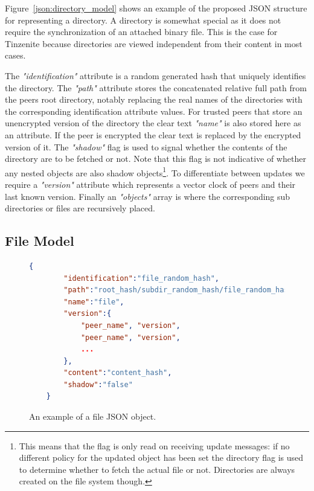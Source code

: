 Figure~\ref{json:directory_model} shows an example of the proposed JSON structure for representing a directory.
A directory is somewhat special as it does not require the synchronization of an attached binary file.
This is the case for Tinzenite because directories are viewed independent from their content in most cases.

The \textit{"identification"} attribute is a random generated hash that uniquely identifies the directory.
The \textit{"path"} attribute stores the concatenated relative full path from the peers root directory, notably replacing the real names of the directories with the corresponding identification attribute values.
For trusted peers that store an unencrypted version of the directory the clear text \textit{"name"} is also stored here as an attribute.
If the peer is encrypted the clear text is replaced by the encrypted version of it.
The \textit{"shadow"} flag is used to signal whether the contents of the directory are to be fetched or not.
Note that this flag is not indicative of whether any nested objects are also shadow objects\footnote{This means that the flag is only read on receiving update messages: if no different policy for the updated object has been set the directory flag is used to determine whether to fetch the actual file or not. Directories are always created on the file system though.}.
To differentiate between updates we require a \textit{"version"} attribute which represents a vector clock of peers and their last known version.
Finally an \textit{"objects"} array is where the corresponding sub directories or files are recursively placed.

\subsection{File Model}
\label{sec:file_model}

\begin{figure}[htp]
    \begin{lstlisting}[language=json,firstnumber=0]
    {
        "identification":"file_random_hash",
        "path":"root_hash/subdir_random_hash/file_random_hash",
        "name":"file",
        "version":{
            "peer_name", "version",
            "peer_name", "version",
            ...
        },
        "content":"content_hash",
        "shadow":"false"
    }
    \end{lstlisting}
\caption[File JSON Model]{An example of a file JSON object.}
\label{json:file_model}
\end{figure}

